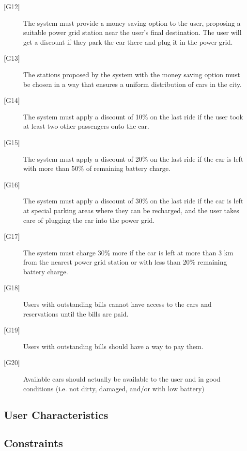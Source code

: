 \documentclass[english]{article}
\begin{document}
\begin{description}
	\item[{[G12]}]{The system must provide a money saving option to the user, proposing a suitable power grid station near the user’s final destination. The user will get a discount if they park the car there and plug it in the power grid.}
	\item[{[G13]}]{The stations proposed by the system with the money saving option must be chosen in a way that ensures a uniform distribution of cars in the city.}
	\item[{[G14]}]{The system must apply a discount of 10\% on the last ride if the user took at least two other passengers onto the car.}
	\item[{[G15]}]{The system must apply a discount of 20\% on the last ride if the car is left with more than 50\% of remaining battery charge.}
	\item[{[G16]}]{The system must apply a discount of 30\% on the last ride if the car is left at special parking areas where they can be recharged, and the user takes care of plugging the car into the power grid.}
	\item[{[G17]}]{The system must charge 30\% more if the car is left at more than 3 km from the nearest power grid station or with less than 20\% remaining battery charge.}
	\item[{[G18]}]{Users with outstanding bills cannot have access to the cars and reservations until the bills are paid.}
	\item[{[G19]}]{Users with outstanding bills should have a way to pay them.}
	\item[{[G20]}]{Available cars should actually be available to the user and in good conditions (i.e. not dirty, damaged, and/or with low battery)}
\end{description}

\subsection{User Characteristics}

\subsection{Constraints}\label{constraints}
\end{document}
